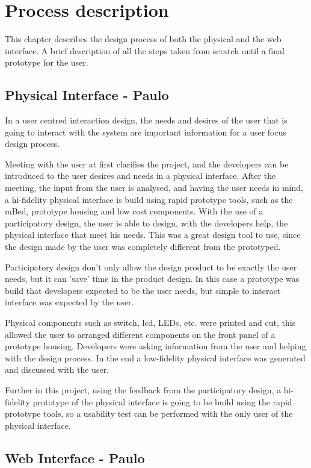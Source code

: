 \chapter{Process description}

This chapter describes the design process of both the physical and the web interface. A brief description of all the steps taken from scratch until a final prototype for the user.

\section{Physical Interface - Paulo}

In a user centred interaction design, the needs and desires of the user that is going to interact with the system are important information for a user focus design process.

Meeting with the user at first clarifies the project, and the developers can be introduced to the user desires and needs in a physical interface. After the meeting, the input from the user is analysed, and having the user needs in mind, a hi-fidelity physical interface is build using rapid prototype tools, such as the mBed, prototype housing and low cost components.
With the use of a participatory design, the user is able to design, with the developers help, the physical interface that meet his needs. This was a great design tool to use, since the design made by the user was completely different from the prototyped.

Participatory design don't only allow the design product to be exactly the user needs, but it can 'save' time in the product design. In this case a prototype was build that developers expected to be the user needs, but simple to interact interface was expected by the user.

Physical components such as switch, lcd, LEDs, etc. were printed and cut, this allowed the user to arranged different components on the front panel of a prototype housing. Developers were asking information from the user and helping with the design process. In the end a low-fidelity physical interface was generated and discussed with the user.

Further in this project, using the feedback from the participatory design, a hi-fidelity prototype of the physical interface is going to be build using the rapid prototype tools, so a usability test can be performed with the only user of the physical interface.

\section{Web Interface - Paulo} 

